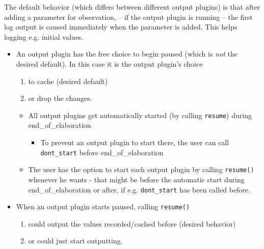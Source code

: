 
The default behavior (which differs between different output plugins) is that after adding a parameter for observation, -- if the output plugin is running -- the first log output is caused immediately when the parameter is added. This helps logging e.g. initial values.

\let\oldtheenumi=\theenumi
\let\oldlabelenumi=\labelenumi
\renewcommand{\theenumi}{\roman{enumi}}
\renewcommand{\labelenumi}{\alph{enumi})}

\begin{itemize}
  \item An output plugin has the free choice to begin paused (which is \textsl{not} the desired default). In this case it is the output plugin's choice %
    \begin{enumerate}
        \item to cache (desired default)
        \item or drop the changes.
    \end{enumerate}
    \begin{itemize}
      \item All output plugins get automatically started (by calling \lstinline|resume|) during end\_of\_elaboration
      \begin{itemize}
        \item To prevent an output plugin to start there, the user can call \lstinline|dont_start| before end\_of\_elaboration
      \end{itemize}
      \item The user has the option to start each output plugin by calling \lstinline|resume()| whenever he wants - that might be before the automatic start during end\_of\_elaboration or after, if e.g. \lstinline|dont_start| has been called before.
    \end{itemize}

  \item When an output plugin starts paused, calling \lstinline|resume()|
    \begin{enumerate}
          \item could output the values recorded/cached before (desired behavior)
          \item or could just start outputting.
    \end{enumerate}


\end{itemize}
